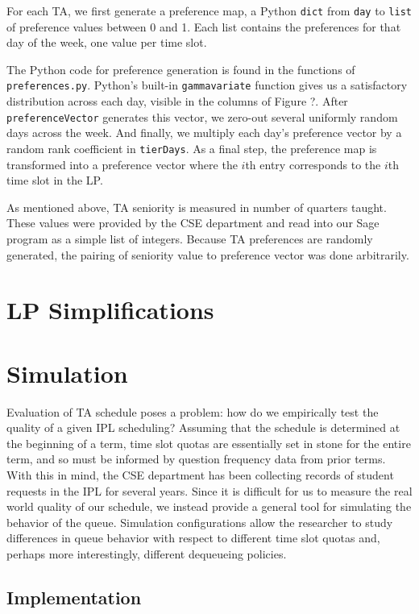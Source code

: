 \documentclass{article}
\begin{document}
\begin{multicols}{2}
For each TA, we first generate a preference map, a Python \texttt{dict} from \texttt{day} to \texttt{list} of preference values between 0 and 1. Each list contains the preferences for that day of the week, one value per time slot.

The Python code for preference generation is found in the functions of \texttt{preferences.py}. Python's built-in \texttt{gammavariate} function gives us a satisfactory distribution across each day, visible in the columns of Figure ?. After \texttt{preferenceVector} generates this vector, we zero-out several uniformly random days across the week. And finally, we multiply each day's preference vector by a random rank coefficient in \texttt{tierDays}. As a final step, the preference map is transformed into a preference vector where the $i$th entry corresponds to the $i$th time slot in the LP.

As mentioned above, TA seniority is measured in number of quarters taught. These values were provided by the CSE department and read into our Sage program as a simple list of integers. Because TA preferences are randomly generated, the pairing of seniority value to preference vector was done arbitrarily.

\section*{LP Simplifications}

\section*{Simulation}

Evaluation of TA schedule poses a problem: how do we empirically test the quality of a given IPL scheduling? Assuming that the schedule is determined at the beginning of a term, time slot quotas are essentially set in stone for the entire term, and so must be informed by question frequency data from prior terms. With this in mind, the CSE department has been collecting records of student requests in the IPL for several years. Since it is difficult for us to measure the real world quality of our schedule, we instead provide a general tool for simulating the behavior of the queue. Simulation configurations allow the researcher to study differences in queue behavior with respect to different time slot quotas and, perhaps more interestingly, different dequeueing policies.

\subsection*{Implementation}


\end{multicols}
\end{document}
